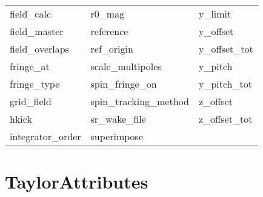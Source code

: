 \begin{tabular}{lll}
field_calc                  & r0_mag                      & y_limit                     \\
field_master                & reference                   & y_offset                    \\
field_overlaps              & ref_origin                  & y_offset_tot                \\
fringe_at                   & scale_multipoles            & y_pitch                     \\
fringe_type                 & spin_fringe_on              & y_pitch_tot                 \\
grid_field                  & spin_tracking_method        & z_offset                    \\
hkick                       & sr_wake_file                & z_offset_tot                \\
integrator_order            & superimpose                 &                             \\
 \bottomrule
 \end{tabular}
 \vfill
 
 \section{TaylorAttributes}
 \label{s:list.taylor}
 
